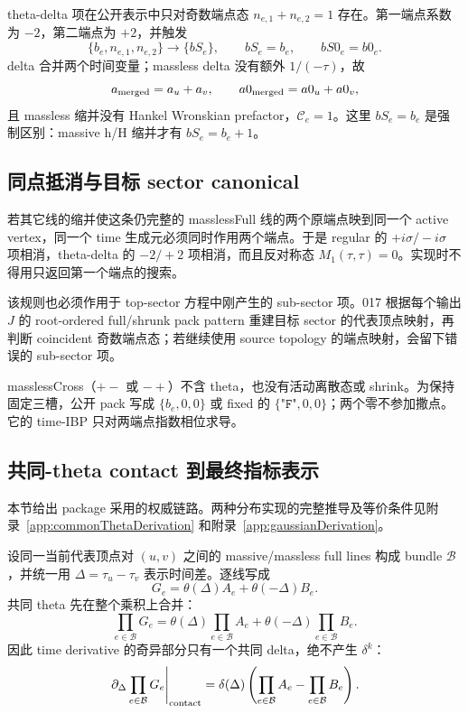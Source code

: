 ﻿\documentclass[a4paper,11pt]{article}
\begin{document}
theta-delta 项在公开表示中只对奇数端点态 $n_{e,1}+n_{e,2}=1$ 存在。第一端点系数为 $-2$，第二端点为 $+2$，并触发
\begin{equation}
 \{b_e,n_{e,1},n_{e,2}\}\longrightarrow\{bS_e\},\qquad
 bS_e=b_e,\qquad bS0_e=b0_e.
 \label{masslessShrinkTech}
\end{equation}
 delta 合并两个时间变量；massless delta 没有额外 $1/(-\tau)$，故
\begin{equation}
 a_{\rm merged}=a_u+a_v,\qquad
 a0_{\rm merged}=a0_u+a0_v,
\end{equation}
且 massless 缩并没有 Hankel Wronskian prefactor，$\mathcal C_e=1$。这里 $bS_e=b_e$ 是强制区别：massive h/H 缩并才有 $bS_e=b_e+1$。

\subsection{同点抵消与目标 sector canonical}

若其它线的缩并使这条仍完整的 masslessFull 线的两个原端点映到同一个 active vertex，同一个 time 生成元必须同时作用两个端点。于是 regular 的 $+i\sigma/-i\sigma$ 项相消，theta-delta 的 $-2/+2$ 项相消，而且反对称态 $M_1(\tau,\tau)=0$。实现时不得用只返回第一个端点的搜索。

该规则也必须作用于 top-sector 方程中刚产生的 sub-sector 项。017 根据每个输出 $J$ 的 root-ordered full/shrunk pack pattern 重建目标 sector 的代表顶点映射，再判断 coincident 奇数端点态；若继续使用 source topology 的端点映射，会留下错误的 sub-sector 项。

masslessCross（$+-$ 或 $-+$）不含 theta，也没有活动离散态或 shrink。为保持固定三槽，公开 pack 写成 $\{b_e,0,0\}$ 或 fixed 的 $\{\texttt{"F"},0,0\}$；两个零不参加撒点。它的 time-IBP 只对两端点指数相位求导。

\subsection{共同-theta contact 到最终指标表示}

本节给出 package 采用的权威链路。两种分布实现的完整推导及等价条件见附录~\ref{app:commonThetaDerivation} 和附录~\ref{app:gaussianDerivation}。

设同一当前代表顶点对 $(u,v)$ 之间的 massive/massless full lines 构成 bundle $\mathcal B$，并统一用 $\Delta=\tau_u-\tau_v$ 表示时间差。逐线写成
\begin{equation}
 G_e=\theta(\Delta)A_e+\theta(-\Delta)B_e.
 \label{bundleSingleLine}
\end{equation}
共同 theta 先在整个乘积上合并：
\begin{equation}
 \prod_{e\in\mathcal B}G_e
 =\theta(\Delta)\prod_{e\in\mathcal B}A_e
 +\theta(-\Delta)\prod_{e\in\mathcal B}B_e.
 \label{bundleCommonThetaProduct}
\end{equation}
因此 time derivative 的奇异部分只有一个共同 delta，绝不产生 $\delta^k$：
\begin{equation}
 \left.\partial_\Delta\prod_{e\in\mathcal B}G_e\right|_{\rm contact}
 =\delta(\Delta)
 \left(\prod_{e\in\mathcal B}A_e-\prod_{e\in\mathcal B}B_e\right).
 \label{bundleUniqueBoundary}
\end{equation}
\end{document}
